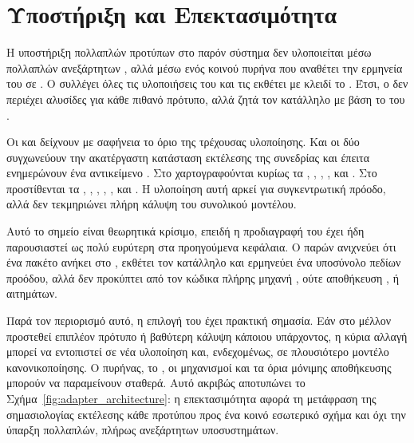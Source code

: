 \section{Υποστήριξη  και Επεκτασιμότητα}
\label{sec:standards_extensibility}

Η υποστήριξη πολλαπλών προτύπων στο παρόν σύστημα δεν υλοποιείται μέσω πολλαπλών ανεξάρτητων , αλλά μέσω ενός κοινού πυρήνα που αναθέτει την ερμηνεία του  σε . Ο \texttt{} συλλέγει όλες τις υλοποιήσεις του \texttt{} και τις εκθέτει με κλειδί το . Έτσι, ο \texttt{} δεν περιέχει  αλυσίδες για κάθε πιθανό πρότυπο, αλλά ζητά τον κατάλληλο  με βάση το  του .

Οι \texttt{} και \texttt{} δείχνουν με σαφήνεια το όριο της τρέχουσας υλοποίησης. Και οι δύο  συγχωνεύουν την ακατέργαστη κατάσταση εκτέλεσης της συνεδρίας και έπειτα ενημερώνουν ένα αντικείμενο \texttt{}. Στο  χαρτογραφούνται κυρίως τα \texttt{}, \texttt{}, \texttt{}, \texttt{}, \texttt{} και \texttt{}. Στο  προστίθενται τα \texttt{}, \texttt{}, \texttt{}, \texttt{}, \texttt{}, \texttt{} και \texttt{}. Η υλοποίηση αυτή αρκεί για συγκεντρωτική πρόοδο, αλλά δεν τεκμηριώνει πλήρη κάλυψη του συνολικού  μοντέλου.

Αυτό το σημείο είναι θεωρητικά κρίσιμο, επειδή η προδιαγραφή του  έχει ήδη παρουσιαστεί ως πολύ ευρύτερη στα προηγούμενα κεφάλαια. Ο παρών  ανιχνεύει ότι ένα πακέτο ανήκει στο , εκθέτει τον κατάλληλο  και ερμηνεύει ένα υποσύνολο πεδίων προόδου, αλλά δεν προκύπτει από τον κώδικα πλήρης μηχανή , ούτε αποθήκευση ,  ή \texttt{} αιτημάτων.

Παρά τον περιορισμό αυτό, η επιλογή του  έχει πρακτική σημασία. Εάν στο μέλλον προστεθεί επιπλέον πρότυπο ή βαθύτερη κάλυψη κάποιου υπάρχοντος, η κύρια αλλαγή μπορεί να εντοπιστεί σε νέα υλοποίηση \texttt{} και, ενδεχομένως, σε πλουσιότερο μοντέλο κανονικοποίησης. Ο  πυρήνας, το , οι  μηχανισμοί και τα όρια μόνιμης αποθήκευσης μπορούν να παραμείνουν σταθερά. Αυτό ακριβώς αποτυπώνει το Σχήμα~\ref{fig:adapter_architecture}: η επεκτασιμότητα αφορά τη μετάφραση της σημασιολογίας εκτέλεσης κάθε προτύπου προς ένα κοινό εσωτερικό σχήμα και όχι την ύπαρξη πολλαπλών, πλήρως ανεξάρτητων υποσυστημάτων.


